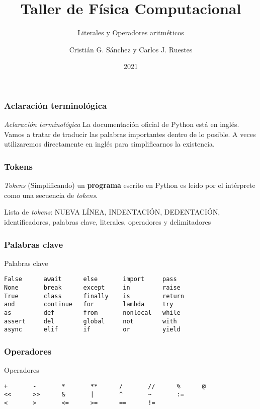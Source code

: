 \documentclass{beamer}
\title{Taller de Física Computacional}
\subtitle{Literales y Operadores aritméticos}
\author{Cristián G. Sánchez y Carlos J. Ruestes}
\date{2021}
\begin{document}
\frame{\titlepage}

\begin{frame}
\frametitle{Aclaración terminológica}
\begin{block}{{\em Aclaración terminológica}}
La documentación oficial de Python está en inglés. Vamos a tratar de traducir las palabras importantes dentro de lo posible. A veces utilizaremos directamente en inglés para simplificarnos la existencia.
\end{block}
\end{frame}

\begin{frame}
\frametitle{Tokens}
\begin{block}{{\em Tokens}}
(Simplificando) un {\bf programa} escrito en Python es leído por el intérprete como una secuencia de {\em tokens}.
\end{block}
\begin{block}{Lista de {\em tokens}:}
NUEVA LÍNEA, INDENTACIÓN, DEDENTACIÓN, identificadores, palabras clave, literales, operadores y delimitadores
\end{block}
\end{frame}

\begin{frame}[fragile]
\frametitle{Palabras clave}
\begin{block}{{Palabras clave}}
\begin{verbatim}
False      await      else       import     pass
None       break      except     in         raise
True       class      finally    is         return
and        continue   for        lambda     try
as         def        from       nonlocal   while
assert     del        global     not        with
async      elif       if         or         yield
\end{verbatim}
\end{block}
\end{frame}

\begin{frame}[fragile]
\frametitle{Operadores}
\begin{block}{{Operadores}}
\begin{verbatim}
+       -       *       **      /       //      %      @
<<      >>      &       |       ^       ~       :=
<       >       <=      >=      ==      !=
\end{verbatim}
\end{block}
\end{frame}
\end{document}
